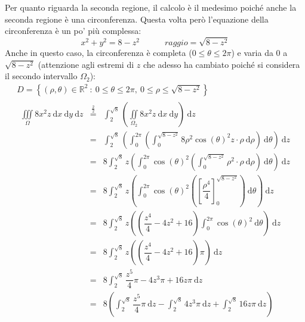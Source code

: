 \documentclass[a4paper]{article}
\begin{document}
	Per quanto riguarda la seconda regione, il calcolo è il medesimo poiché anche la seconda regione è una circonferenza. Questa volta però l'equazione della circonferenza è un po' più complessa:
	\begin{equation*}
		x^{2}+y^{2} = 8 - z^{2} \hspace{3em} raggio = \sqrt{8-z^{2}}
	\end{equation*}
	Anche in questo caso, la circonferenza è completa ($0 \le \theta \le 2\pi$) e varia da $0$ a $\sqrt{8-z^{2}}$ (attenzione agli estremi di $z$ che adesso ha cambiato poiché si considera il secondo intervallo $\Omega_{2}$):
	\begin{gather*}
		D = \left\{\left(\rho, \theta\right) \in \mathbb{R}^{2} \: : \: 0 \le \theta \le 2\pi, \: 0 \le \rho \le \sqrt{8-z^{2}}\right\} \\
		\begin{array}{rcl}
			\displaystyle\iiint\limits_{\Omega} 8x^{2}z \:\mathrm{d}x\:\mathrm{d}y\:\mathrm{d}z 
			&\overset{\frac{2}{2}}{=}& 
			\displaystyle\int_{2}^{\sqrt{8}} \left(\iint\limits_{\Omega_{2}}8x^{2}z \:\mathrm{d}x\:\mathrm{d}y\right) \:\mathrm{d}z \\ [2em]
			&=&
			\displaystyle\int_{2}^{\sqrt{8}} \left(\int_{0}^{2\pi} \left(\int_{0}^{\sqrt{8-z^{2}}} 8 \rho^{2}\cos\left(\theta\right)^{2}z \cdot \rho \:\mathrm{d}\rho\right) \:\mathrm{d}\theta\right) \:\mathrm{d}z \\ [1.5em]
			&=&
			8\displaystyle\int_{2}^{\sqrt{8}} z \left(\int_{0}^{2\pi} \cos\left(\theta\right)^{2} \left(\int_{0}^{\sqrt{8-z^{2}}} \rho^{2} \cdot \rho \:\mathrm{d}\rho\right) \:\mathrm{d}\theta\right) \:\mathrm{d}z \\ [1.5em]
			&=&
			8\displaystyle\int_{2}^{\sqrt{8}} z \left(\int_{0}^{2\pi} \cos\left(\theta\right)^{2} \left(\left[\dfrac{\rho^{4}}{4}\right]_{0}^{\sqrt{8-z^{2}}} \right) \:\mathrm{d}\theta\right) \:\mathrm{d}z \\ [1.5em]
			&=&
			8\displaystyle\int_{2}^{\sqrt{8}} z \left( \left( \dfrac{z^{4}}{4} - 4z^{2} + 16\right) \int_{0}^{2\pi} \cos\left(\theta\right)^{2} \:\mathrm{d}\theta\right) \:\mathrm{d}z \\ [1.5em]
			&=&
			8\displaystyle\int_{2}^{\sqrt{8}} z \left( \left( \dfrac{z^{4}}{4} - 4z^{2} + 16\right) \pi\right) \:\mathrm{d}z \\ [1.5em]
			&=&
			8\displaystyle\int_{2}^{\sqrt{8}} \dfrac{z^{5}}{4}\pi - 4z^{3}\pi + 16z\pi \:\mathrm{d}z \\ [1.5em]
			&=&
			8\left(\displaystyle\int_{2}^{\sqrt{8}} \dfrac{z^{5}}{4}\pi \:\mathrm{d}z - \int_{2}^{\sqrt{8}} 4z^{3}\pi \:\mathrm{d}z + \int_{2}^{\sqrt{8}} 16z\pi \:\mathrm{d}z\right) \\ [1.5em]

\end{array}
\end{gather*}
\end{document}
